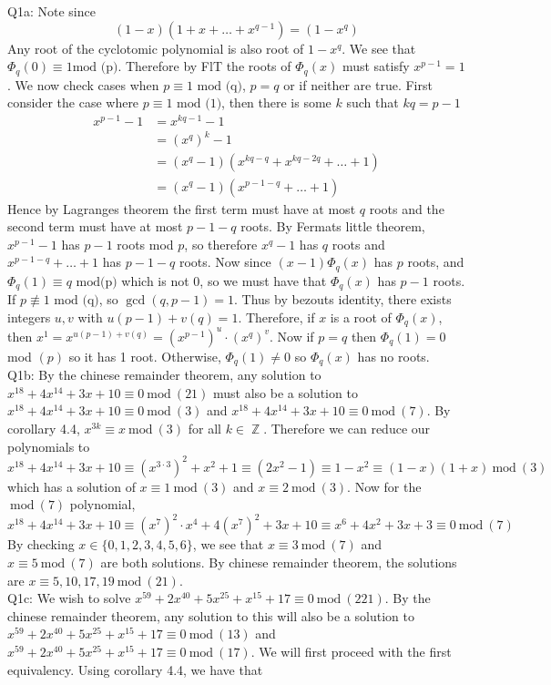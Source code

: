 \documentclass[letterpaper]{article}
\DeclareMathOperator{\Z}{\mathbb{Z}}
\newcommand{\Mod}[1]{\ \mathrm{mod}\ (#1)}
\begin{document}
\noindent Q1a: Note since $$(1-x)(1+x+ \dots + x^{q-1}) = (1-x^q)$$ Any root of the cyclotomic polynomial is also root of $1-x^q$. We see that $\Phi_q(0)\equiv 1 \text{mod (p)}$. Therefore by FlT the roots of $\Phi_q(x)$ must satisfy $x^{p-1}= 1$. We now check cases when $p\equiv 1 \text{ mod (q)}$, $p=q$ or if neither are true. 
First consider the case where $p\equiv 1 \text{ mod (1)}$, then there is some $k$ such that $kq = p-1$
\begin{align*}
x^{p-1}-1 & = x^{kq-1}-1
\\ & = (x^q)^k-1
\\ & = (x^q -1)(x^{kq-q} + x^{kq-2q} + \dots +1)
\\ & = (x^{q}-1)(x^{p-1-q} + \dots + 1)
\end{align*} Hence by Lagranges theorem the first term must have at most $q$ roots and the second term must have at most $p-1-q$ roots. By Fermats little theorem, $x^{p-1}-1$ has $p-1$ roots mod $p$, so therefore $x^q-1$ has $q$ roots and $x^{p-1-q} + \dots + 1$ has $p-1-q$ roots. Now since $(x-1)\Phi_q(x)$ has $p$ roots, and $\Phi_q(1) \equiv q \text{ mod(p)}$ which is not 0, so we must have that $\Phi_q(x)$ has $p-1$ roots. If $ p\not\equiv 1 \text{ mod (q)}$, so $\gcd(q,p-1)=1$. Thus by bezouts identity, there exists integers $u,v$ with $u(p-1) + v(q)=1$. Therefore, if $x$ is a root of $\Phi_q(x)$, then $x^1 = x^{u(p-1) + v(q)} = (x^{p-1})^u \cdot (x^{q})^v $. Now if $p=q$ then $\Phi_q(1) = 0$ mod $(p)$ so it has 1 root. Otherwise, $\Phi_q(1)\neq 0$ so $\Phi_q(x)$ has no roots.
\newline \\ Q1b: By the chinese remainder theorem, any solution to $x^{18} + 4x^{14}+3x+10 \equiv 0 \Mod{21}$ must also be a solution to $x^{18} + 4x^{14}+3x+10 \equiv 0 \Mod{3}$ and $x^{18} + 4x^{14}+3x+10 \equiv 0 \Mod{7}$. By corollary 4.4, $x^{3k}\equiv x \Mod{3}$ for all $k\in \Z$. Therefore we can reduce our polynomials to $$x^{18} + 4x^{14}+3x+10 \equiv (x^{3\cdot 3})^2 + x^2+1 \equiv (2x^2-1)\equiv 1-x^2 \equiv(1-x)(1+x)  \Mod{3}$$ which has a solution of $x\equiv 1 \Mod{3}$ and $x\equiv 2 \Mod{3}$. Now for the $\Mod{7}$ polynomial, 
$$x^{18} + 4x^{14}+3x+10 \equiv (x^{7})^2\cdot x^4 + 4(x^7)^2 + 3x + 10 \equiv x^6+4x^2 +3x+3 \equiv 0 \Mod{7}$$
By checking $x\in \{0,1,2,3,4,5,6\}$, we see that $x\equiv 3 \Mod{7}$ and $x\equiv 5 \Mod{7}$ are both solutions. 
By chinese remainder theorem, the solutions are $x\equiv 5,10,17,19 \Mod{21}$. 
\newline \\ Q1c: We wish to solve $x^{59}+ 2x^{40}+5x^{25}+x^{15}+17\equiv 0 \Mod{221} $. By the chinese remainder theorem, any solution to this will also be a solution to $x^{59}+ 2x^{40}+5x^{25}+x^{15}+17\equiv 0\Mod{13}$ and $x^{59}+ 2x^{40}+5x^{25}+x^{15}+17\equiv 0 \Mod{17}$. We will first proceed with the first equivalency. Using corollary 4.4, we have that 
\end{document}

